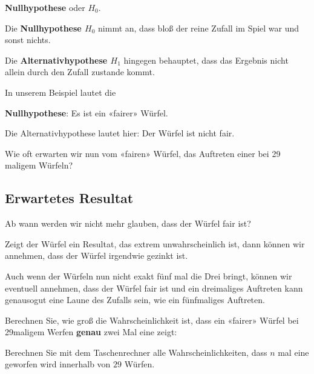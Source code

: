 \begin{center}\textbf{Nullhypothese} oder {$H_0$}.\end{center}

Die \textbf{Nullhypothese $H_0$} nimmt an, dass bloß der reine Zufall
im Spiel war und sonst nichts.

Die \textbf{Alternativhypothese $H_1$} hingegen behauptet, dass das
Ergebnis nicht allein durch den Zufall zustande kommt.

In unserem Beispiel lautet die

\textbf{Nullhypothese}: Es ist ein «fairer» Würfel.

Die Alternativhypothese lautet hier: Der Würfel ist nicht fair.

Wie oft erwarten wir nun vom «fairen» Würfel, das Auftreten
einer  bei 29 maligem Würfeln?


\newpage
\subsection{Erwartetes Resultat}
Ab wann werden wir nicht mehr glauben, dass der Würfel fair ist?

Zeigt der Würfel ein Resultat, das extrem unwahrscheinlich ist, dann
können wir annehmen, dass der Würfel irgendwie gezinkt ist.

Auch wenn der Würfeln nun nicht exakt fünf mal die Drei bringt, können
wir eventuell annehmen, dass der Würfel fair ist und ein dreimaliges
Auftreten kann genausogut eine Laune des Zufalls sein, wie ein
fünfmaliges Auftreten.

Berechnen Sie, wie groß die Wahrscheinlichkeit ist, dass ein «fairer»
Würfel bei 29maligem Werfen \textbf{genau} zwei Mal eine 
zeigt:


Berechnen Sie mit dem Taschenrechner alle Wahrscheinlichkeiten, dass
$n$ mal eine  geworfen wird innerhalb von $29$ Würfen.

